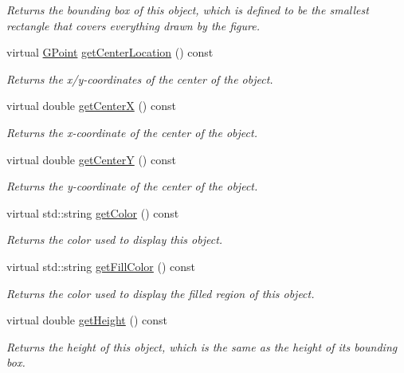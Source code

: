 \begin{DoxyCompactItemize}
\begin{DoxyCompactList}\small\item\em Returns the bounding box of this object, which is defined to be the smallest rectangle that covers everything drawn by the figure. \end{DoxyCompactList}\item 
virtual \mbox{\hyperlink{structsgl_1_1GPoint}{G\+Point}} \mbox{\hyperlink{classsgl_1_1GObject_a0909472e91448470bccdb62ecfb95d8b}{get\+Center\+Location}} () const
\begin{DoxyCompactList}\small\item\em Returns the x/y-\/coordinates of the center of the object. \end{DoxyCompactList}\item 
virtual double \mbox{\hyperlink{classsgl_1_1GObject_a04df74355b545e0543112d5b8d924176}{get\+CenterX}} () const
\begin{DoxyCompactList}\small\item\em Returns the {\itshape x}-\/coordinate of the center of the object. \end{DoxyCompactList}\item 
virtual double \mbox{\hyperlink{classsgl_1_1GObject_acb3287a3d507025a26f54b895713b947}{get\+CenterY}} () const
\begin{DoxyCompactList}\small\item\em Returns the {\itshape y}-\/coordinate of the center of the object. \end{DoxyCompactList}\item 
virtual std\+::string \mbox{\hyperlink{classsgl_1_1GObject_aa061dfa488c31e18549d64363c1d0e34}{get\+Color}} () const
\begin{DoxyCompactList}\small\item\em Returns the color used to display this object. \end{DoxyCompactList}\item 
virtual std\+::string \mbox{\hyperlink{classsgl_1_1GObject_a76f6964a11fde7c78e9751be184e1a3c}{get\+Fill\+Color}} () const
\begin{DoxyCompactList}\small\item\em Returns the color used to display the filled region of this object. \end{DoxyCompactList}\item 
virtual double \mbox{\hyperlink{classsgl_1_1GObject_a1e7e353362434072875264cf95629f99}{get\+Height}} () const
\begin{DoxyCompactList}\small\item\em Returns the height of this object, which is the same as the height of its bounding box. \end{DoxyCompactList}\item 

\end{DoxyCompactItemize}
